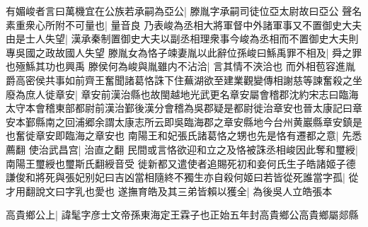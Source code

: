 有媚峻者言曰萬機宜在公族若承嗣為亞公|{
	滕胤字承嗣司徒位亞太尉故曰亞公}
聲名素重衆心所附不可量也|{
	量音良}
乃表峻為丞相大將軍督中外諸軍事又不置御史大夫由是士人失望|{
	漢承秦制置御史大夫以副丞相理衆事今峻為丞相而不置御史大夫則專吳國之政故國人失望}
滕胤女為恪子竦妻胤以此辭位孫峻曰鯀禹罪不相及|{
	舜之罪也殛鯀其功也興禹}
滕侯何為峻與胤雖内不沾洽|{
	言其情不浹洽也}
而外相苞容進胤爵高密侯共事如前齊王奮聞諸葛恪誅下住蕪湖欲至建業觀變傳相謝慈等諫奮殺之坐廢為庶人徙章安|{
	章安前漢治縣也故閩越地光武更名章安屬會稽郡沈約宋志曰臨海太守本會稽東部都尉前漢治鄞後漢分會稽為吳郡疑是都尉徙治章安也晉太康記曰章安本鄞縣南之回浦郷余謂太康志所云即吳臨海郡之章安縣地今台州黄巖縣章安鎮是也奮徙章安即臨海之章安也}
南陽王和妃張氏諸葛恪之甥也先是恪有遷都之意|{
	先悉薦翻}
使治武昌宫|{
	治直之翻}
民間或言恪欲迎和立之及恪被誅丞相峻因此奪和璽綬|{
	南陽王璽綬也璽斯氏翻綬音受}
徙新都又遣使者追賜死初和妾何氏生子皓諸姬子德謙俊和將死與張妃别妃曰吉凶當相隨終不獨生亦自殺何姬曰若皆從死誰當字孤|{
	從才用翻說文曰字乳也愛也}
遂撫育皓及其三弟皆賴以獲全|{
	為後吳人立皓張本}


高貴鄉公上|{
	諱髦字彦士文帝孫東海定王霖子也正始五年封高貴鄉公高貴鄉屬郯縣}


